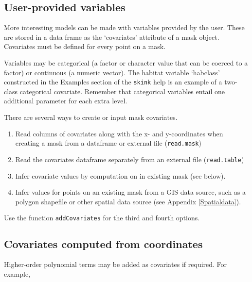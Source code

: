 \documentclass[
]{book}
\newenvironment{Shaded}{\begin{snugshade}}{\end{snugshade}}
\newcommand{\DecValTok}[1]{\textcolor[rgb]{0.00,0.00,0.81}{#1}}
\newcommand{\FunctionTok}[1]{\textcolor[rgb]{0.13,0.29,0.53}{\textbf{#1}}}
\newcommand{\NormalTok}[1]{#1}
\newcommand{\OtherTok}[1]{\textcolor[rgb]{0.56,0.35,0.01}{#1}}
\newcommand{\SpecialCharTok}[1]{\textcolor[rgb]{0.81,0.36,0.00}{\textbf{#1}}}
\newcommand{\StringTok}[1]{\textcolor[rgb]{0.31,0.60,0.02}{#1}}
\begin{document}
\subsection{User-provided variables}\label{user-provided-variables}

More interesting models can be made with variables provided by the user. These are stored in a data frame as the `covariates' attribute of a mask object. Covariates must be defined for every point on a mask.

Variables may be categorical (a factor or character value that can be coerced to a factor) or continuous (a numeric vector). The habitat variable `habclass' constructed in the Examples section of the \texttt{skink} help is an example of a two-class categorical covariate. Remember that categorical variables entail one additional
parameter for each extra level.

There are several ways to create or input mask covariates.

\begin{enumerate}
\def\labelenumi{\arabic{enumi}.}
\item
  Read columns of covariates along with the x- and y-coordinates
  when creating a mask from a dataframe or external file
  (\texttt{read.mask})
\item
  Read the covariates dataframe separately from an external file
  (\texttt{read.table})
\item
  Infer covariate values by computation on in existing mask (see below).
\item
  Infer values for points on an existing mask from a GIS data source, such as a polygon shapefile or other spatial data source (see Appendix \ref{Spatialdata}).
\end{enumerate}

Use the function \texttt{addCovariates} for the third and fourth options.

\subsection{Covariates computed from coordinates}\label{covariates-computed-from-coordinates}

Higher-order polynomial terms may be added as covariates if required. For example,

\begin{Shaded}
\end{Shaded}
\end{document}
